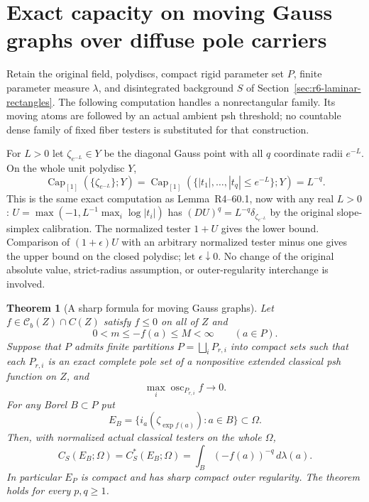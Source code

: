 \documentclass[11pt,a4paper]{article}
\numberwithin{equation}{section}
\newtheorem{theorem}{Theorem}[section]
\theoremstyle{definition}
\theoremstyle{remark}
\begin{document}


\section{Exact capacity on moving Gauss graphs over diffuse pole carriers}
\label{sec:r6-laminar-gauss-graphs}

Retain the original field, polydiscs, compact rigid parameter set $P$,
finite parameter measure $\lambda$, and disintegrated background $S$
of Section~\ref{sec:r6-laminar-rectangles}. The following computation
handles a nonrectangular family. Its moving atoms are followed by an
actual ambient psh threshold; no countable dense family of fixed fiber
testers is substituted for that construction.

For $L>0$ let $\zeta_{e^{-L}}\in Y$ be the diagonal Gauss point with
all $q$ coordinate radii $e^{-L}$. On the whole unit polydisc $Y$,
\begin{equation}
 \operatorname{Cap}_{[1]}(\{\zeta_{e^{-L}}\};Y)
 =\operatorname{Cap}_{[1]}(\{|t_1|,\ldots,|t_q|\le e^{-L}\};Y)
 =L^{-q}.
 \label{eq:r6-arbitrary-radius-capacity}
\end{equation}
This is the same exact computation as
Lemma~\textup{R4--60.1}, now with any real $L>0$:
$U=\max(-1,L^{-1}\max_i\log|t_i|)$ has
$(DU)^q=L^{-q}\delta_{\zeta_{e^{-L}}}$ by the original slope-simplex
calibration. The normalized tester $1+U$ gives the lower bound.
Comparison of $(1+\epsilon)U$ with an arbitrary normalized tester
minus one gives the upper bound on the closed polydisc; let
$\epsilon\downarrow0$. No change of the original absolute value,
strict-radius assumption, or outer-regularity interchange is involved.

\begin{theorem}[A sharp formula for moving Gauss graphs]
\label{thm:r6-laminar-gauss-graph-capacity}
Let $f\in\mathcal C_b(Z)\cap C(Z)$ satisfy $f\le0$ on all of $Z$
and
\[
                        0<m\le-f(a)\le M<\infty\qquad(a\in P).
\]
Suppose that $P$ admits finite partitions
$P=\bigsqcup_iP_{r,i}$ into compact sets such that each $P_{r,i}$
is an exact complete pole set of a nonpositive extended classical psh
function on $Z$, and
\[
              \max_i\operatorname{osc}_{P_{r,i}}f\longrightarrow0.
\]
For any Borel $B\subset P$ put
\[
 E_B=\{i_a(\zeta_{\exp f(a)}):a\in B\}\subset\Omega.
\]
Then, with normalized actual classical testers on the whole $\Omega$,
\begin{equation}
 C_S(E_B;\Omega)=C_S^*(E_B;\Omega)
                   =\int_B(-f(a))^{-q}\,d\lambda(a).
 \label{eq:r6-gauss-graph-capacity}
\end{equation}
In particular $E_P$ is compact and has sharp compact outer regularity.
The theorem holds for every $p,q\ge1$.
\end{theorem}
\end{document}
